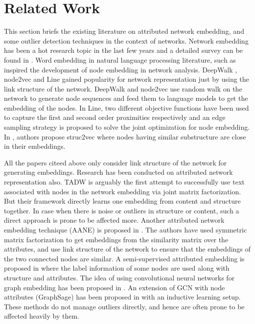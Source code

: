 \documentclass[letterpaper]{article} %
\begin{document}
\section{Related Work}\label{sec:rw}
This section briefs the existing literature on attributed network embedding, and some outlier detection techniques in the context of networks. Network embedding has been a hot research topic in the last few years and a detailed survey can be found in \cite{hamilton2017representation}.
Word embedding in natural language processing literature, such as \cite{mikolov2013efficient} inspired the development of node embedding in network analysis.
DeepWalk \cite{perozzi2014deepwalk}, node2vec \cite{grover2016node2vec} and Line \cite{tang2015line} gained popularity for network representation just by using the link structure of the network. DeepWalk and node2vec use random walk on the network to generate node sequences and feed them to language models to get the embedding of the nodes. In Line, two different objective functions have been used to capture the first and second order proximities respectively and an edge sampling strategy is proposed to solve the joint optimization for node embedding. In \cite{ribeiro2017struc2vec}, authors propose struc2vec where nodes having similar substructure are close in their embeddings.

All the papers citeed above only consider link structure of the network for generating embeddings. Research has been conducted on attributed network representation also. TADW \cite{yang2015network} is arguably the first attempt to successfully use text associated with nodes in the network embedding via joint matrix factorization. But their framework directly learns one embedding from content and structure together. In case when there is noise or outliers in structure or content, such a direct approach is prone to be affected more. Another attributed network embedding technique (AANE) is proposed in \cite{huang2017accelerated}. The authors have used symmetric matrix factorization to get embeddings from the similarity matrix over the attributes, and use link structure of the network to ensure that the embeddings of the two connected nodes are similar. A semi-supervised attributed embedding is proposed in \cite{huang2017label} where the label information of some nodes are used along with structure and attributes. The idea of using convolutional neural networks for graph embedding has been proposed in \cite{niepert2016learning,kipf2016semi}. An extension of GCN with node attributes (GraphSage) has been proposed in \cite{hamilton2017inductive} with an inductive learning setup. These methods do not manage outliers directly, and hence are often prone to be affected heavily by them.
\end{document}

